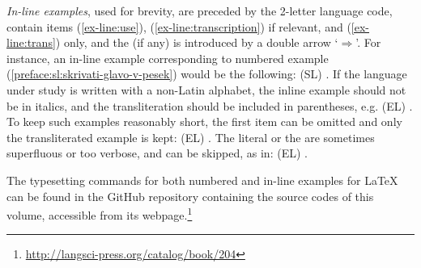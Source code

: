 \documentclass[output=paper,
modfonts,
]{langscibook}
\begin{document}




\emph{In-line examples}, used for brevity, are preceded by the 2-letter language code, contain items (\ref{ex-line:use}), (\ref{ex-line:transcription}) if relevant, and (\ref{ex-line:trans}) only, and the  (if any) is introduced by a double arrow `$\Rightarrow$'. For instance, an in-line example corresponding to numbered example (\ref{preface:sl:skrivati-glavo-v-pesek}) would be the following: (SL) . 
%
If the language under study is written with a non-Latin alphabet, the inline example should not be in italics, and the transliteration should be included in parentheses, e.g. (EL) . To keep such examples reasonably short, the first item can be omitted and only the transliterated example is kept: (EL) . 
%
The literal or the  are sometimes superfluous or too verbose, and can be skipped, as in:  (EL) . 

The typesetting commands for both numbered and in-line examples for {\LaTeX} can be found in the GitHub repository containing the source codes of this volume, accessible from its webpage.\footnote{\url{http://langsci-press.org/catalog/book/204}} %

\end{document}
